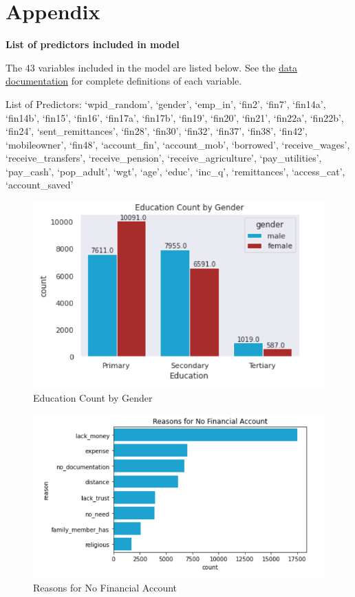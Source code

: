 \documentclass[water,article,submit,moreauthors,pdftex]{mdpi}
\begin{document}
\hypertarget{appendix}{%
\section{Appendix}\label{appendix}}

\textbf{List of predictors included in model}

The 43 variables included in the model are listed below. See the
\href{https://github.com/sds-capstone/2022-09-proj7-women-at-table/blob/main/data-documentation/ddi-documentation-english_microdata-3324.pdf}{data
documentation} for complete definitions of each variable.

List of Predictors: `wpid\_random', `gender', `emp\_in', `fin2', `fin7',
`fin14a', `fin14b', `fin15', `fin16', `fin17a', `fin17b', `fin19',
`fin20', `fin21', `fin22a', `fin22b', `fin24', `sent\_remittances',
`fin28', `fin30', `fin32', `fin37', `fin38', `fin42', `mobileowner',
`fin48', `account\_fin', `account\_mob', `borrowed', `receive\_wages',
`receive\_transfers', `receive\_pension', `receive\_agriculture',
`pay\_utilities', `pay\_cash', `pop\_adult', `wgt', `age', `educ',
`inc\_q', `remittances', `access\_cat', `account\_saved'

\begin{figure}
\centering
\includegraphics[width=\textwidth,height=0.5\textheight]{images/educ_count_gender.png}
\caption{Education Count by Gender}
\end{figure}

\begin{figure}
\centering
\includegraphics[width=\textwidth,height=0.5\textheight]{images/reasons_no_fin_acc.png}
\caption{Reasons for No Financial Account}
\end{figure}
\end{document}
